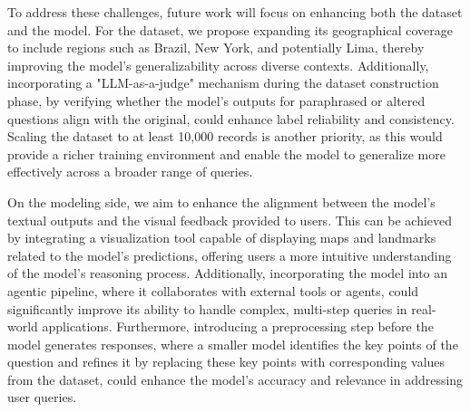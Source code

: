 To address these challenges, future work will focus on enhancing both the dataset and the model. For the dataset, we propose expanding its geographical coverage to include regions such as Brazil, New York, and potentially Lima, thereby improving the model's generalizability across diverse contexts. Additionally, incorporating a "LLM-as-a-judge" mechanism during the dataset construction phase, by verifying whether the model's outputs for paraphrased or altered questions align with the original, could enhance label reliability and consistency. Scaling the dataset to at least 10,000 records is another priority, as this would provide a richer training environment and enable the model to generalize more effectively across a broader range of queries.

On the modeling side, we aim to enhance the alignment between the model’s textual outputs and the visual feedback provided to users. This can be achieved by integrating a visualization tool capable of displaying maps and landmarks related to the model's predictions, offering users a more intuitive understanding of the model’s reasoning process. Additionally, incorporating the model into an agentic pipeline, where it collaborates with external tools or agents, could significantly improve its ability to handle complex, multi-step queries in real-world applications. Furthermore, introducing a preprocessing step before the model generates responses, where a smaller model identifies the key points of the question and refines it by replacing these key points with corresponding values from the dataset, could enhance the model's accuracy and relevance in addressing user queries.



